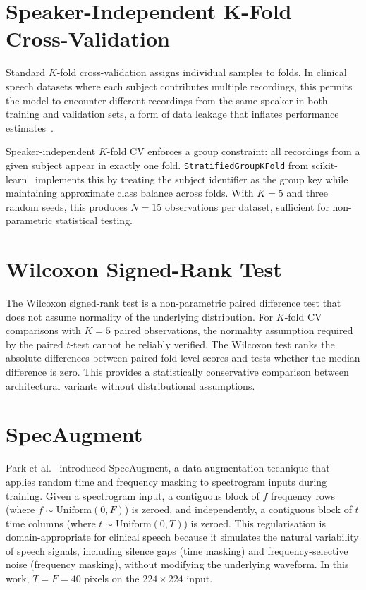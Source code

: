 \documentclass[oneside,openany]{final_report}
\begin{document}
\section{Speaker-Independent K-Fold Cross-Validation}

Standard $K$-fold cross-validation assigns individual samples to folds. In clinical speech datasets where each subject contributes multiple recordings, this permits the model to encounter different recordings from the same speaker in both training and validation sets, a form of data leakage that inflates performance estimates~\cite{sakar2013}.

Speaker-independent $K$-fold CV enforces a group constraint: all recordings from a given subject appear in exactly one fold. \texttt{StratifiedGroupKFold} from scikit-learn~\cite{sklearn2011} implements this by treating the subject identifier as the group key while maintaining approximate class balance across folds. With $K\!=\!5$ and three random seeds, this produces $N\!=\!15$ observations per dataset, sufficient for non-parametric statistical testing.

\section{Wilcoxon Signed-Rank Test}

The Wilcoxon signed-rank test is a non-parametric paired difference test that does not assume normality of the underlying distribution. For $K$-fold CV comparisons with $K\!=\!5$ paired observations, the normality assumption required by the paired $t$-test cannot be reliably verified. The Wilcoxon test ranks the absolute differences between paired fold-level scores and tests whether the median difference is zero. This provides a statistically conservative comparison between architectural variants without distributional assumptions.

\section{SpecAugment}

Park et al.~\cite{park2019} introduced SpecAugment, a data augmentation technique that applies random time and frequency masking to spectrogram inputs during training. Given a spectrogram input, a contiguous block of $f$ frequency rows (where $f \sim \text{Uniform}(0, F)$) is zeroed, and independently, a contiguous block of $t$ time columns (where $t \sim \text{Uniform}(0, T)$) is zeroed. This regularisation is domain-appropriate for clinical speech because it simulates the natural variability of speech signals, including silence gaps (time masking) and frequency-selective noise (frequency masking), without modifying the underlying waveform. In this work, $T = F = 40$ pixels on the $224 \times 224$ input.
\end{document}
